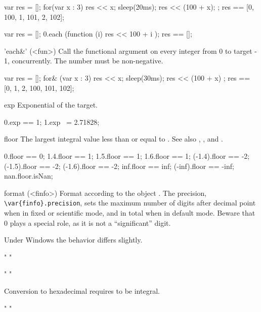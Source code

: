 \begin{urbiscriptapi}
\begin{urbiassert}
{
  var res = [];
  for(var x : 3) { res << x; sleep(20ms); res << (100 + x); };
  res
}
== [0, 100, 1, 101, 2, 102];

{
  var res = [];
  0.each (function (i) { res << 100 + i });
  res
}
== [];
\end{urbiassert}


\item['each&'](<fun>)%
  Call the functional argument  on every integer from 0 to
  target - 1, concurrently.  The number must be non-negative.
\begin{urbiassert}
{
  var res = [];
  for& (var x : 3) { res << x; sleep(30ms); res << (100 + x) };
  res
}
== [0, 1, 2, 100, 101, 102];
\end{urbiassert}%


\item[exp]
  Exponential of the target.
\begin{urbiassert}
0.exp == 1;
1.exp ~= 2.71828;
\end{urbiassert}


\item[floor] The largest integral value less than or equal to \this.  See
  also , , and .
\begin{urbiassert}
     0.floor ==  0;
   1.4.floor ==  1;     1.5.floor ==  1;    1.6.floor ==  1;
(-1.4).floor == -2;  (-1.5).floor == -2; (-1.6).floor == -2;
   inf.floor == inf; (-inf).floor == -inf;
   nan.floor.isNan;
\end{urbiassert}


\item[format](<finfo>)%
  Format according to the  object .
  The precision, \lstinline|\var{finfo}.precision|, sets the maximum
  number of digits after decimal point when in fixed or scientific
  mode, and in total when in default mode.  Beware that 0 plays a
  special role, as it is not a ``significant'' digit.

  \begin{windows}
    Under Windows the behavior differs slightly.
  \end{windows}
\begin{urbiassert}
"%
"%

"%
"%
\end{urbiassert}

  Conversion to hexadecimal requires \this to be integral.
\begin{urbiassert}
"%
"%


\end{urbiassert}
\end{urbiscriptapi}
